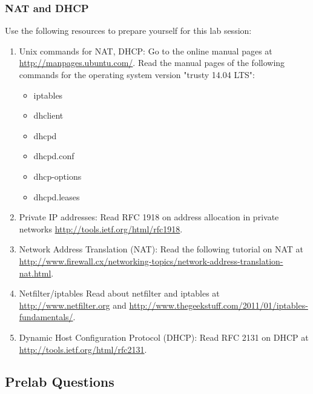 
\subsubsection*{NAT and DHCP}
Use the following resources to prepare yourself for this lab session:
\begin{enumerate}
	\item Unix commands for NAT, DHCP: Go to the online manual pages at \url{http://manpages.ubuntu.com/}. Read the manual pages of the following commands for the operating system version "trusty 14.04 LTS":
		\begin{itemize}
			\item iptables
			\item dhclient
			\item dhcpd
			\item dhcpd.conf
			\item dhcp-options
			\item dhcpd.leases
		\end{itemize}
	\item Private IP addresses: Read RFC 1918 on address allocation in private networks \url{http://tools.ietf.org/html/rfc1918}.
	\item Network Address Translation (NAT): Read the following tutorial on NAT at \url{http://www.firewall.cx/networking-topics/network-address-translation-nat.html}.
	\item Netfilter/iptables Read about netfilter and iptables at \url{http://www.netfilter.org} and \url{http://www.thegeekstuff.com/2011/01/iptables-fundamentals/}.
	\item Dynamic Host Configuration Protocol (DHCP): Read RFC 2131 on DHCP at \url{http://tools.ietf.org/html/rfc2131}.
\end{enumerate}

\newpage
\subsection*{Prelab Questions}
\begin{questions}
\end{questions}

